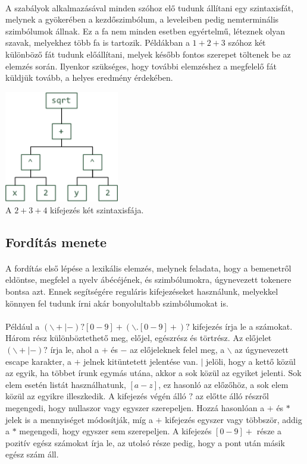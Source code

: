 \documentclass{elteikthesis}
\begin{document}
\paragraph{}
A szabályok alkalmazásával minden szóhoz elő tudunk állítani egy szintaxisfát, melynek a gyökerében a kezdőszimbólum, a leveleiben pedig nemterminális szimbólumok állnak. Ez a fa nem minden esetben egyértelmű, léteznek olyan szavak, melyekhez több fa is tartozik. Példákban a $1+2+3$ szóhoz két különböző fát tudunk előállítani, melyek később fontos szerepet töltenek be az elemzés során. Ilyenkor szükséges, hogy további elemzéshez a megfelelő fát küldjük tovább, a helyes eredmény érdekében.
\begin{center}
\includegraphics[width=5cm]{pics/syntax_tree}\\
{\footnotesize A $2+3+4$ kifejezés két szintaxisfája.}
\end{center}
\subsection{Fordítás menete}
\paragraph{}
A fordítás első lépése a lexikális elemzés, melynek feladata, hogy a bemenetről eldöntse, megfelel a nyelv ábécéjének, és szimbólumokra, úgynevezett tokenere bontsa azt. Ennek segítségére reguláris kifejezéseket használunk, melyekkel könnyen fel tudunk írni akár bonyolultabb szimbólumokat is.
\paragraph{}
Például a $(\backslash +|-)?[0-9]+(\backslash.[0-9]+)?$ kifejezés írja le a számokat. Három rész különböztethető meg, előjel, egészrész és törtrész. Az előjelet $(\backslash+|-)?$ írja le, ahol a $+$ és $-$ az előjeleknek felel meg, a $\backslash$ az úgynevezett escape karakter, a $+$ jelnek kitüntetett jelentése van. $|$ jelöli, hogy a kettő közül az egyik, ha többet írunk egymás utána, akkor a sok közül az egyiket jelenti. Sok elem esetén listát használhatunk, $[a-z]$, ez hasonló az előzőhöz, a sok elem közül az egyikre illeszkedik. A kifejezés végén álló $?$ az előtte álló részről megengedi, hogy nullaszor vagy egyszer szerepeljen. Hozzá hasonlóan a $+$ és $*$ jelek is a mennyiséget módosítják, míg a $+$ kifejezés egyszer vagy többször, addig a $*$ megengedi, hogy egyszer sem szerepeljen. A kifejezés $[0-9]+$ része a pozitív egész számokat írja le, az utolsó része pedig, hogy a pont után másik egész szám áll.
\end{document}
